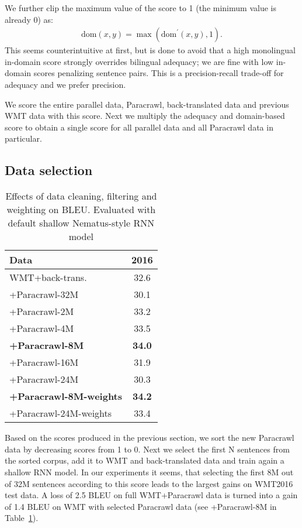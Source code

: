 \documentclass[11pt,a4paper]{article}
\begin{document}
We further clip the maximum value of the score to 1 (the minimum value is already 0) as:
\begin{equation}
\begin{aligned}
\mathrm{dom}(x,y) = \max(\mathrm{dom}^\prime(x,y), 1).
\end{aligned}
\end{equation}
This seems counterintuitive at first, but is done to avoid that a high monolingual in-domain score strongly overrides bilingual adequacy; we are fine with low in-domain scores penalizing sentence pairs. This is a precision-recall trade-off for adequacy and we prefer precision.

We score the entire parallel data, Paracrawl, back-translated data and previous WMT data with this score. Next we multiply the adequacy and domain-based score to obtain a single score for all parallel data and all Paracrawl data in particular.

\subsection{Data selection}

\begin{table}[t]
\centering
\begin{tabular}{lc}
\toprule
Data & 2016 \\
\midrule
WMT+back-trans. & 32.6 \\ \midrule
+Paracrawl-32M & 30.1 \\ \midrule
+Paracrawl-2M & 33.2 \\
+Paracrawl-4M & 33.5 \\
\bf +Paracrawl-8M & \bf 34.0 \\
+Paracrawl-16M & 31.9 \\
+Paracrawl-24M & 30.3 \\ \midrule
\bf +Paracrawl-8M-weights & \bf 34.2 \\
+Paracrawl-24M-weights & 33.4 \\
\bottomrule
\end{tabular}
\caption{Effects of data cleaning, filtering and weighting on BLEU. Evaluated with default shallow Nematus-style RNN model}\label{para-filt}
\end{table}

Based on the scores produced in the previous section, we sort the new Paracrawl data by decreasing scores from 1 to 0. Next we select the first N sentences from the sorted corpus, add it to WMT and back-translated data and train again a shallow RNN model. In our experiments it seems, that selecting the first 8M out of 32M sentences according to this score leads to the largest gains on WMT2016 test data. A loss of 2.5 BLEU on full WMT+Paracrawl data is turned into a gain of 1.4 BLEU on WMT with selected Paracrawl data (see +Paracrawl-8M in Table~\ref{para-filt}). 
\end{document}
